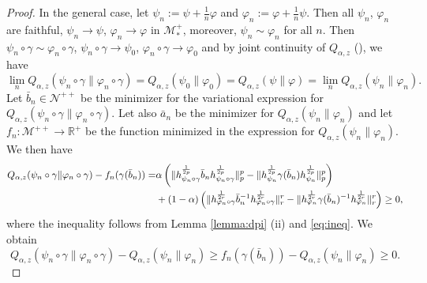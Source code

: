 \documentclass[12pt]{article}
\theoremstyle{definition}
\theoremstyle{remark}
\numberwithin{equation}{section}
\def\Me{\mathcal M}
\def\Ne{\mathcal N}
\def\ffi{\varphi}
\begin{document}
\begin{proof}
 In the general case, let $\psi_n:=\psi+\frac1n \ffi$ and $\ffi_n:=\ffi+\frac1n \psi$.
 Then all $\psi_n$, $\ffi_n$ are faithful,  $\psi_n\to \psi$,  $\ffi_n\to \ffi$ in $\Me_*^+$,
moreover,  $\psi_n\sim \ffi_n$ for
all $n$. Then $\psi_n\circ\gamma\sim \ffi_n\circ\gamma$, $\psi_n\circ\gamma\to \psi_0$,
$\ffi_n \circ \gamma\to \ffi_0$ and by joint continuity of $Q_{\alpha,z}$ (\cite[Thm. 1 (iv)]{kato2023onrenyi}), we have
\[
\lim_n
Q_{\alpha,z}(\psi_n\circ\gamma\|\ffi_n\circ\gamma)=Q_{\alpha,z}(\psi_0\|\ffi_0)=Q_{\alpha,z}(\psi\|\ffi)=\lim_n
Q_{\alpha,z}(\psi_n\|\ffi_n).
\]
Let $\bar b_{n}\in \Ne^{++}$ be the minimizer for the variational expression for
$Q_{\alpha,z}(\psi_n\circ\gamma\|\ffi_n\circ\gamma)$. Let also $\bar a_n$ be the minimizer
for $Q_{\alpha,z}(\psi_n\|\ffi_n)$ and let $f_n:\Me^{++}\to \mathbb R^+$
be the function minimized in the expression for $Q_{\alpha,z}(\psi_n\|\ffi_n)$. 
We then have 
\begin{align*}
Q_{\alpha,z}(\psi_n\circ\gamma\|\ffi_n\circ\gamma)-f_n(\gamma(\bar
b_{n}))=&\alpha\left(\|h_{\psi_n\circ\gamma}^{\frac1{2p}}\bar b_{n}
h_{\psi_n\circ\gamma}^{\frac1{2p}}\|_p^p-\|h_{\psi_n}^{1\over 2p}\gamma(\bar
b_n)h_{\psi_n}^{1\over 2p}\|_p^p\right)\\
& + (1-\alpha)\left(\|h_{\ffi_n\circ\gamma}^{\frac1{2r}}\bar b_{n}^{-1}
h_{\ffi_n\circ\gamma}^{\frac1{2r}}\|_r^r-\|h_{\ffi_n}^{1\over 2r}\gamma(\bar
b_n)^{-1}h_{\ffi_n}^{1\over 2r}\|_r^r\right)\ge 0,
\end{align*}
where the inequality follows from Lemma \ref{lemma:dpi} (ii) and \eqref{eq:ineq}. We
obtain
\begin{equation}\label{eq:qfn}
Q_{\alpha,z}(\psi_n\circ\gamma\|\ffi_n\circ\gamma)-Q_{\alpha,z}(\psi_n\|\ffi_n)\ge f_n(\gamma(\bar
b_{n}))-Q_{\alpha,z}(\psi_n\|\ffi_n)\ge 0.
\end{equation}


\end{proof}
\end{document}
